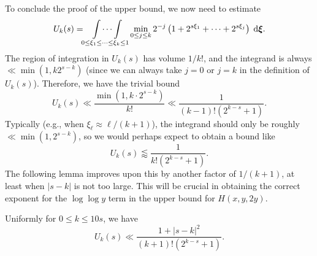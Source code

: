 To conclude the proof of the upper bound, we now need to estimate 
\begin{equation*}
    U_k(s) =\idotsint \limits_{0 \le \xi_1 \le \dots \le \xi_k\le 1} \min \limits_{0 \le j \le k} 2^{-j} \left( 1 + 2^{s\xi_1} + \dots + 2^{s \xi_j} \right) \; \mathrm{d} \bm{\xi}.
\end{equation*} 
The region of integration in $U_k(s)$ has volume $1/k!$, and the integrand is always $\ll \min (1, k 2^{s-k})$ (since we can always take $j = 0$ or $j=k$ in the definition of $U_k(s)$).
Therefore, we have the trivial bound
\begin{equation*}
    U_k(s) \ll \frac{\min (1, k\cdot2^{s - k})}{k!} \ll \frac{1}{(k - 1)! (2^{k - s} + 1)}. 
\end{equation*}
Typically (e.g., when $\xi_\ell \approx \ell/(k + 1)$), the integrand should only be roughly $\ll \min(1, 2^{s - k})$,
so we would perhaps expect to obtain a bound like
\begin{equation*}
    U_k(s) \lessapprox \frac{1}{k!(2^{k - s} + 1)}.
\end{equation*}
The following lemma improves upon this by another factor of $1/(k + 1)$, at least when $|s - k|$ is not too large.
This will be crucial in obtaining the correct exponent for the $\log \log y$ term in the upper bound for $H(x, y, 2y)$.
\begin{lemma}
    \label{lem:estimate-U-k-s}
    Uniformly for $0 \le k \le 10 s$, we have
    \begin{equation*}
        U_k(s) \ll \frac{1 + |s - k|^2}{(k + 1)!( 2^{k - s} + 1)}.
    \end{equation*}
\end{lemma}

